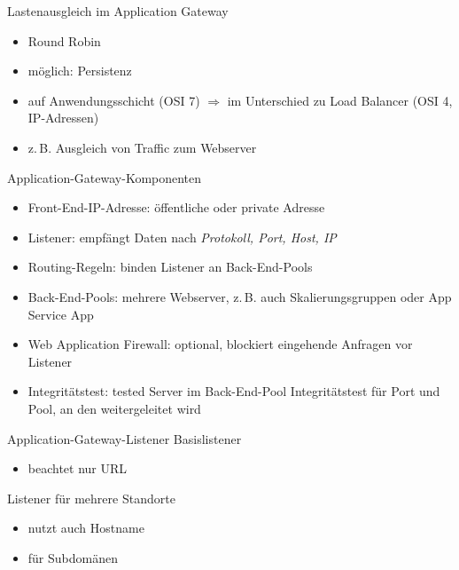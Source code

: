 \begin{flashcard}[Definition]{Lastenausgleich im Application Gateway}
    \begin{itemize}
        \item Round Robin
        \item möglich: Persistenz
        \item auf Anwendungsschicht (OSI 7)\newline
            $\Rightarrow$ im Unterschied zu Load Balancer (OSI 4, IP-Adressen)
        \item z.\,B. Ausgleich von Traffic zum Webserver
    \end{itemize}
\end{flashcard}

\begin{flashcard}[Definition]{Application-Gateway-Komponenten}
    \begin{itemize}
        \item Front-End-IP-Adresse: öffentliche oder private Adresse
        \item Listener: empfängt Daten nach \emph{Protokoll, Port, Host, IP}
        \item Routing-Regeln: binden Listener an Back-End-Pools
        \item Back-End-Pools: mehrere Webserver, z.\,B. auch Skalierungsgruppen oder App Service App
        \item Web Application Firewall: optional, blockiert eingehende Anfragen vor Listener
        \item Integritätstest: tested Server im Back-End-Pool\newline
            Integritätstest für Port und Pool, an den weitergeleitet wird
    \end{itemize}
\end{flashcard}

\begin{flashcard}[Definition]{Application-Gateway-Listener}
    Basislistener
    \begin{itemize}
        \item beachtet nur URL
    \end{itemize}
    \vspace{1cm}
    Listener für mehrere Standorte
    \begin{itemize}
        \item nutzt auch Hostname
        \item für Subdomänen
    \end{itemize}
\end{flashcard}

